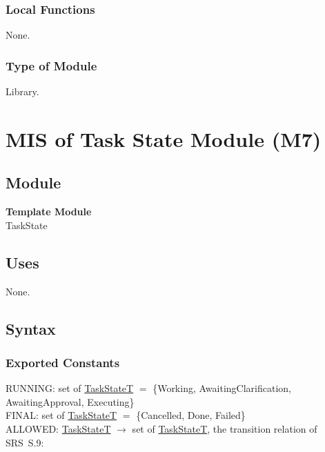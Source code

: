 \documentclass[12pt, titlepage]{article}
\begin{document}
\subsubsection{Local Functions}

None.

\subsubsection{Type of Module}

Library.

\newpage

\section{MIS of Task State Module (M7)} \label{mod:task}

\subsection{Module}

\textbf{Template Module}\\[4pt]
TaskState

\subsection{Uses}

None.

\subsection{Syntax}

\subsubsection{Exported Constants}

\noindent RUNNING: set of \hyperref[type:TaskState]{TaskStateT} $=$ \{Working,
AwaitingClarification, AwaitingApproval, Executing\}\\[2pt]
FINAL: set of \hyperref[type:TaskState]{TaskStateT} $=$ \{Cancelled, Done,
Failed\}\\[2pt]
ALLOWED: \hyperref[type:TaskState]{TaskStateT} $\to$ set of
\hyperref[type:TaskState]{TaskStateT}, the transition relation of SRS~S.9:
\end{document}
